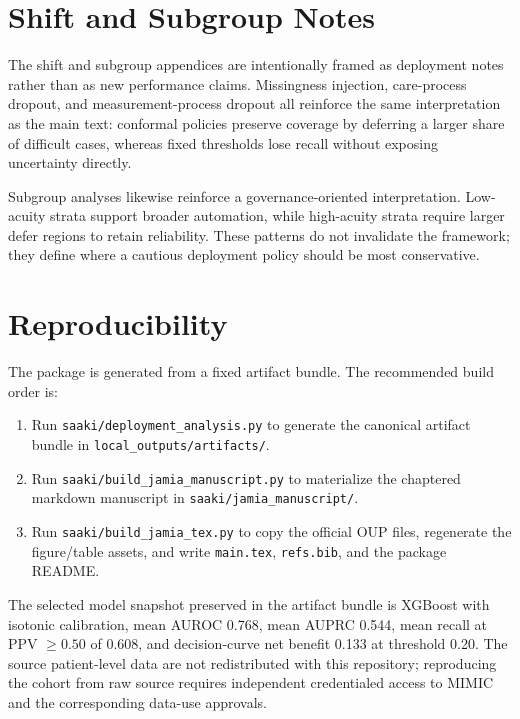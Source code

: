 \documentclass[unnumsec,webpdf,contemporary,large,numbered,nocrop]{oup-authoring-template}
\begin{document}
\begin{appendices}
\section{Shift and Subgroup Notes}\label{app:shift}
The shift and subgroup appendices are intentionally framed as deployment notes rather than as new performance claims. Missingness injection, care-process dropout, and measurement-process dropout all reinforce the same interpretation as the main text: conformal policies preserve coverage by deferring a larger share of difficult cases, whereas fixed thresholds lose recall without exposing uncertainty directly.

Subgroup analyses likewise reinforce a governance-oriented interpretation. Low-acuity strata support broader automation, while high-acuity strata require larger defer regions to retain reliability. These patterns do not invalidate the framework; they define where a cautious deployment policy should be most conservative.

\section{Reproducibility}\label{app:repro}
The package is generated from a fixed artifact bundle. The recommended build order is:
\begin{enumerate}
\item Run \texttt{saaki/deployment\_analysis.py} to generate the canonical artifact bundle in \texttt{local\_outputs/artifacts/}.
\item Run \texttt{saaki/build\_jamia\_manuscript.py} to materialize the chaptered markdown manuscript in \texttt{saaki/jamia\_manuscript/}.
\item Run \texttt{saaki/build\_jamia\_tex.py} to copy the official OUP files, regenerate the figure/table assets, and write \texttt{main.tex}, \texttt{refs.bib}, and the package README.
\end{enumerate}

The selected model snapshot preserved in the artifact bundle is XGBoost with isotonic calibration, mean AUROC 0.768, mean AUPRC 0.544, mean recall at PPV $\geq 0.50$ of 0.608, and decision-curve net benefit 0.133 at threshold 0.20. The source patient-level data are not redistributed with this repository; reproducing the cohort from raw source requires independent credentialed access to MIMIC and the corresponding data-use approvals.




\end{appendices}
\end{document}
